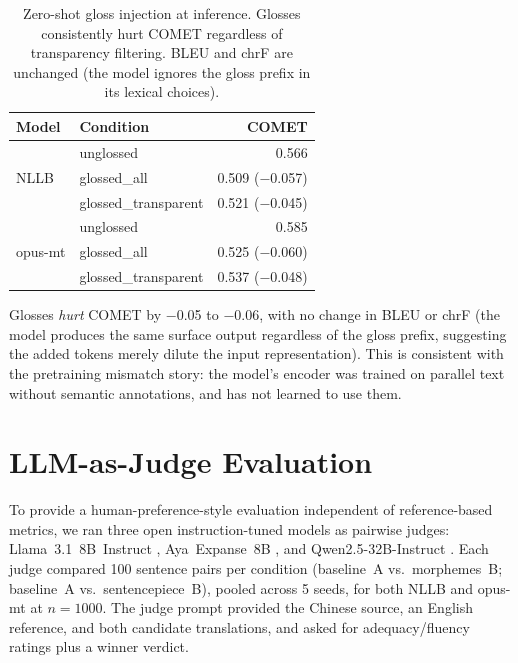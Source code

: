 \documentclass[11pt]{article}
\begin{document}
\begin{table}[t]
\centering
\small
\begin{tabular}{llr}
\toprule
\textbf{Model} & \textbf{Condition} & \textbf{COMET} \\
\midrule
\multirow{3}{*}{NLLB}
 & unglossed              & 0.566 \\
 & glossed\_all           & 0.509 ($-$0.057) \\
 & glossed\_transparent   & 0.521 ($-$0.045) \\
\midrule
\multirow{3}{*}{opus-mt}
 & unglossed              & 0.585 \\
 & glossed\_all           & 0.525 ($-$0.060) \\
 & glossed\_transparent   & 0.537 ($-$0.048) \\
\bottomrule
\end{tabular}
\caption{Zero-shot gloss injection at inference. Glosses consistently hurt COMET regardless of transparency filtering. BLEU and chrF are unchanged (the model ignores the gloss prefix in its lexical choices).}
\label{tab:gloss}
\end{table}

Glosses \textit{hurt} COMET by $-$0.05 to $-$0.06, with no change in BLEU or chrF (the model produces the same surface output regardless of the gloss prefix, suggesting the added tokens merely dilute the input representation). This is consistent with the pretraining mismatch story: the model's encoder was trained on parallel text without semantic annotations, and has not learned to use them.

\section{LLM-as-Judge Evaluation}
\label{sec:llm_judge}

To provide a human-preference-style evaluation independent of reference-based metrics, we ran three open instruction-tuned models as pairwise judges: Llama~3.1~8B~Instruct \citep{dubey-etal-2024-llama3}, Aya~Expanse~8B \citep{ustun-etal-2024-aya}, and Qwen2.5-32B-Instruct \citep{qwen-team-2025-qwen25}. Each judge compared 100 sentence pairs per condition (baseline~A vs.\ morphemes~B; baseline~A vs.\ sentencepiece~B), pooled across 5 seeds, for both NLLB and opus-mt at $n=1000$. The judge prompt provided the Chinese source, an English reference, and both candidate translations, and asked for adequacy/fluency ratings plus a winner verdict.
\end{document}
